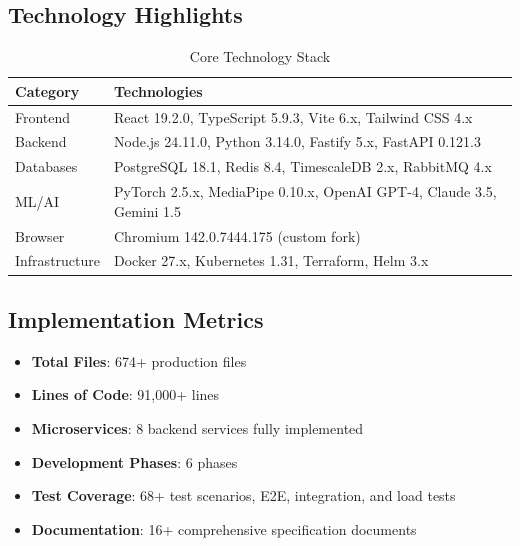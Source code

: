 \documentclass[11pt,letterpaper]{article}
\begin{document}
\subsection{Technology Highlights}

\begin{table}[H]
\centering
\begin{tabularx}{\textwidth}{lX}
\toprule
\textbf{Category} & \textbf{Technologies} \\
\midrule
Frontend & React 19.2.0, TypeScript 5.9.3, Vite 6.x, Tailwind CSS 4.x \\
Backend & Node.js 24.11.0, Python 3.14.0, Fastify 5.x, FastAPI 0.121.3 \\
Databases & PostgreSQL 18.1, Redis 8.4, TimescaleDB 2.x, RabbitMQ 4.x \\
ML/AI & PyTorch 2.5.x, MediaPipe 0.10.x, OpenAI GPT-4, Claude 3.5, Gemini 1.5 \\
Browser & Chromium 142.0.7444.175 (custom fork) \\
Infrastructure & Docker 27.x, Kubernetes 1.31, Terraform, Helm 3.x \\
\bottomrule
\end{tabularx}
\caption{Core Technology Stack}
\end{table}

\subsection{Implementation Metrics}

\begin{itemize}[noitemsep]
    \item \textbf{Total Files}: 674+ production files
    \item \textbf{Lines of Code}: 91,000+ lines
    \item \textbf{Microservices}: 8 backend services fully implemented
    \item \textbf{Development Phases}: 6 phases
    \item \textbf{Test Coverage}: 68+ test scenarios, E2E, integration, and load tests
    \item \textbf{Documentation}: 16+ comprehensive specification documents
\end{itemize}

\end{document}
